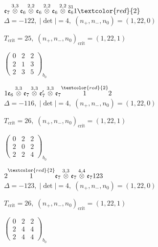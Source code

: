 \documentclass[10pt]{article}
\begin{document}
\smallskip

$\mathfrak{e}_7\overset{3,3}{\otimes}\mathfrak{e}_6\overset{2,2}{\otimes}\mathfrak{e}_6\overset{2,2}{\otimes}\mathfrak{e}_6\overset{2,2}{\otimes}\overset{31}{\mathfrak{e}_6}1\textcolor{red}{2}$ \quad $\Delta=-122,\; |\det|=4,\; (n_+,n_-,n_0)=(1,22,0)$

\hspace{1em}$T_{\text{crit}}=25,\; (n_+,n_-,n_0)_{\text{crit}}=(1,22,1)$

\hspace{2em}$\left(\begin{smallmatrix}0 & 2 & 2 \\ 2 & 1 & 3 \\ 2 & 3 & 5\end{smallmatrix}\right)_{\!b_0}$

\smallskip

$1\mathfrak{e}_6\overset{3,3}{\otimes}\mathfrak{e}_7\overset{3,3}{\otimes}\mathfrak{e}_7'\overset{3,3}{\otimes}\mathfrak{e}_7\overset{\textcolor{red}{2}}{1}2$ \quad $\Delta=-116,\; |\det|=4,\; (n_+,n_-,n_0)=(1,22,0)$

\hspace{1em}$T_{\text{crit}}=26,\; (n_+,n_-,n_0)_{\text{crit}}=(1,22,1)$

\hspace{2em}$\left(\begin{smallmatrix}0 & 2 & 2 \\ 2 & 0 & 2 \\ 2 & 2 & 4\end{smallmatrix}\right)_{\!b_0}$

\smallskip

$2\overset{\textcolor{red}{2}}{1}\mathfrak{e}_7\overset{3,3}{\otimes}\mathfrak{e}_7\overset{4,4}{\otimes}\mathfrak{e}_7123$ \quad $\Delta=-123,\; |\det|=4,\; (n_+,n_-,n_0)=(1,22,0)$

\hspace{1em}$T_{\text{crit}}=26,\; (n_+,n_-,n_0)_{\text{crit}}=(1,22,1)$

\hspace{2em}$\left(\begin{smallmatrix}0 & 2 & 2 \\ 2 & 4 & 4 \\ 2 & 4 & 4\end{smallmatrix}\right)_{\!b_0}$
\end{document}
